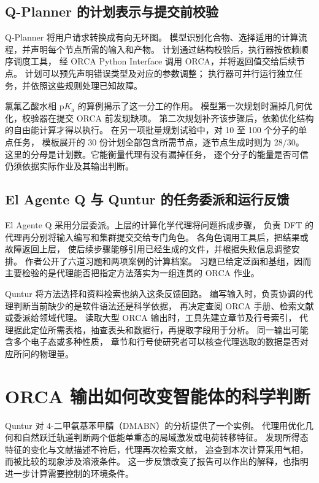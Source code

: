 \documentclass[UTF8,a4paper,11pt,fontset=fandol]{ctexart}
\begin{document}
\subsection{Q-Planner 的计划表示与提交前校验}
Q-Planner 将用户请求转换成有向无环图。
模型识别化合物、选择适用的计算流程，并声明每个节点所需的输入和产物。
计划通过结构校验后，执行器按依赖顺序调度工具，
经 ORCA Python Interface 调用 ORCA，并将返回值交给后续节点。
计划可以预先声明错误类型及对应的参数调整；
执行器可并行运行独立任务，并依照这些规则处理已知故障\cite{qplanner}。

氯氟乙酸水相 $\mathrm{p}K_\mathrm{a}$ 的算例揭示了这一分工的作用。
模型第一次规划时漏掉几何优化，校验器在提交 ORCA 前发现缺项。
第二次规划补齐该步骤后，依赖优化结构的自由能计算才得以执行\cite{qplanner}。
在另一项批量规划试验中，对 10 至 100 个分子的单点任务，
模板展开的 30 份计划全部包含所需节点，逐节点生成时则为 28/30。
这里的分母是计划数。它能衡量代理有没有漏掉任务，
逐个分子的能量是否可信仍须依据实际作业及其输出判断。

\subsection{El Agente Q 与 Quntur 的任务委派和运行反馈}
El Agente Q 采用分层委派。上层的计算化学代理将问题拆成步骤，
负责 DFT 的代理再分别将输入编写和集群提交交给专门角色。
各角色调用工具后，把结果或故障返回上层，
使后续步骤能够引用已经生成的文件，并根据失败信息调整安排。
作者公开了六道习题和两项案例的计算档案。
习题已给定泛函和基组，因而主要检验的是代理能否把指定方法落实为一组连贯的 ORCA 作业\cite{agente}。

Quntur 将方法选择和资料检索也纳入这条反馈回路。
编写输入时，负责协调的代理判断当前缺少的是软件语法还是科学依据，
再决定查阅 ORCA 手册、检索文献或委派给领域代理。
读取大型 ORCA 输出时，工具先建立章节及行号索引，
代理据此定位所需表格，抽查表头和数据行，再提取字段用于分析\cite{quntur}。
同一输出可能含多个电子态或多种性质，
章节和行号使研究者可以核查代理选取的数据是否对应所问的物理量。

\section{ORCA 输出如何改变智能体的科学判断}
Quntur 对 4-二甲氨基苯甲腈（DMABN）的分析提供了一个实例。
代理用优化几何和自然跃迁轨道判断两个低能单重态的局域激发或电荷转移特征。
发现所得态特征的变化与文献描述不符后，代理再次检索文献，
追查到本次计算采用气相，而被比较的现象涉及溶液条件\cite{quntur}。
这一步反馈改变了报告可以作出的解释，也指明进一步计算需要控制的环境条件。
\end{document}
